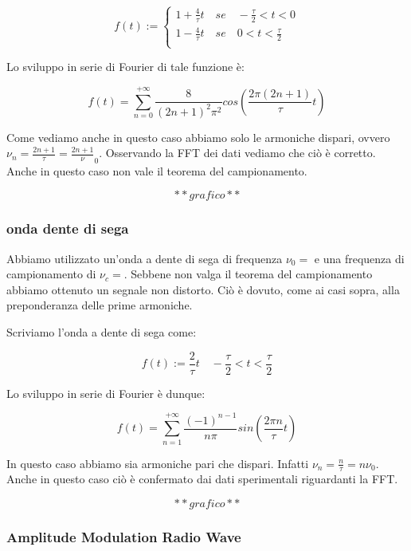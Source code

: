 \begin{displaymath}
f(t):=
\begin{cases}
1+\frac{4}{\tau}t \quad se \quad -\frac{\tau}{2}<t<0 \\
1-\frac{4}{\tau}t \quad se \quad 0<t<\frac{\tau}{2} \\ 
\end{cases}
\end{displaymath}

Lo sviluppo in serie di Fourier di tale funzione è:

\begin{equation}
f(t)=\sum_{n=0}^{+\infty}\frac{8}{(2n+1)^2\pi^2}cos (\frac{2\pi(2n+1)}{\tau}t)
\end{equation}

Come vediamo anche in questo caso abbiamo solo le armoniche dispari, ovvero $\nu_n=\frac{2n+1}{\tau}=\frac{2n+1}\nu_0$. Osservando la FFT dei dati vediamo che ciò è corretto. Anche in questo caso non vale il teorema del campionamento.

$$**grafico**$$

\subsubsection{onda dente di sega}

Abbiamo utilizzato un'onda a dente di sega di frequenza $\nu_0=$ e una frequenza di campionamento di $\nu_c=$. Sebbene non valga il teorema del campionamento abbiamo ottenuto un segnale non distorto. Ciò è dovuto, come ai casi sopra, alla preponderanza delle prime armoniche.

Scriviamo l'onda a dente di sega come: 

$$f(t):= \frac{2}{\tau}t \quad -\frac{\tau}{2}<t<\frac{\tau}{2}$$

Lo sviluppo in serie di Fourier è dunque:

\begin{equation}
f(t)=\sum_{n=1}^{+\infty}\frac{(-1)^{n-1}}{n\pi}sin (\frac{2\pi n}{\tau}t)
\end{equation}


In questo caso abbiamo sia armoniche pari che dispari. Infatti $\nu_n=\frac{n}{\tau}=n\nu_0$. Anche in questo caso ciò è confermato dai dati sperimentali riguardanti la FFT. 

$$**grafico**$$

\subsubsection{Amplitude Modulation Radio Wave}

